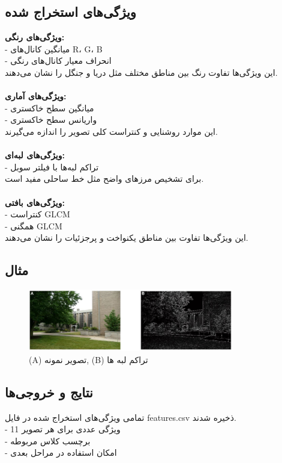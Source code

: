 \documentclass[a4paper,12pt]{article}
\begin{document}
\subsection*{\textbf{ویژگی‌های استخراج شده}}

\textbf{ویژگی‌های رنگی:}\\
- میانگین کانال‌های R، G، B  
\\
- انحراف معیار کانال‌های رنگی  
\\
این ویژگی‌ها تفاوت رنگ بین مناطق مختلف مثل دریا و جنگل را نشان می‌دهند.
\\
\\
\textbf{ویژگی‌های آماری:}\\
- میانگین سطح خاکستری  
\\
- واریانس سطح خاکستری  
\\
این موارد روشنایی و کنتراست کلی تصویر را اندازه می‌گیرند.
\\
\\
\textbf{ویژگی‌های لبه‌ای:}\\
- تراکم لبه‌ها با فیلتر سوبل  
\\
برای تشخیص مرزهای واضح مثل خط ساحلی مفید است.
\\
\\
\textbf{ویژگی‌های بافتی:}\\
- کنتراست GLCM  
\\
- همگنی GLCM  
\\
این ویژگی‌ها تفاوت بین مناطق یکنواخت و پرجزئیات را نشان می‌دهند.

\subsection*{\textbf{مثال}}

\begin{figure}[h]
	\centering
	\includegraphics[width=0.8\textwidth]{image1.png}
	\caption{(A) تصویر نمونه, (B) تراکم لبه ها }
	\label{fig:results}
\end{figure}

\subsection*{\textbf{نتایج و خروجی‌ها}}
تمامی ویژگی‌های استخراج شده در فایل features.csv ذخیره شدند.
\\
- 11 ویژگی عددی برای هر تصویر
\\
- برچسب کلاس مربوطه
\\
- امکان استفاده در مراحل بعدی
\end{document}
